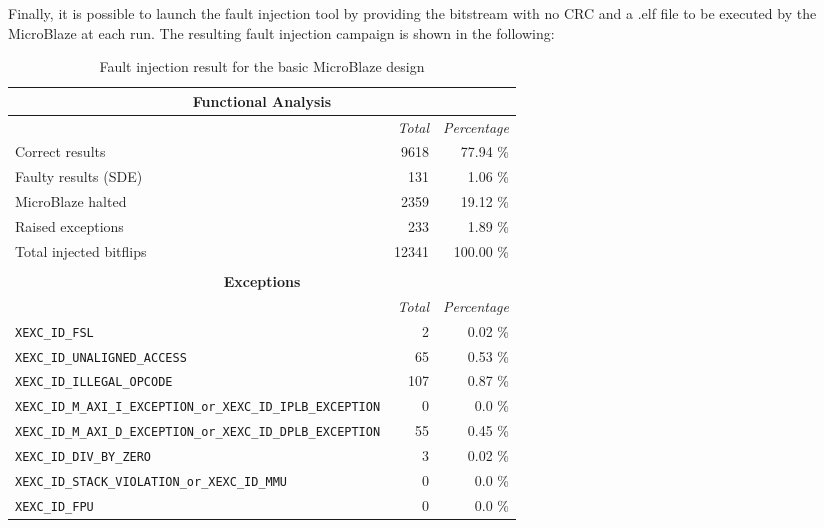 Finally, it is possible to launch the fault injection tool by providing the bitstream with no CRC and a .elf file to be executed by the MicroBlaze at each run. The resulting fault injection campaign is shown in the following:

\begin{table}[H]
\small
\centering
\begin{tabular}{ l|rr }
    \hline
    \multicolumn{3}{|c|}{\textbf{Functional Analysis}} \\
    \hline
    &\textit{Total}&\textit{Percentage} \\
    \cline{2-3}
    Correct results & 9618 & 77.94 \%\\
    Faulty results (SDE) & 131 & 1.06 \%\\
    MicroBlaze halted & 2359 & 19.12 \%\\
    Raised exceptions & 233 & 1.89 \%\\
    \hline
    Total injected bitflips & 12341 & 100.00 \%\\
    \\
    \hline
    \multicolumn{3}{|c|}{\textbf{Exceptions}}\\
    \hline
    &\textit{Total}&\textit{Percentage} \\
    \cline{2-3}
    \small
    \texttt{XEXC\_ID\_FSL} & 2 & 0.02 \%\\
    \texttt{XEXC\_ID\_UNALIGNED\_ACCESS} & 65 & 0.53 \%\\
    \texttt{XEXC\_ID\_ILLEGAL\_OPCODE}& 107 & 0.87 \%\\
    \texttt{XEXC\_ID\_M\_AXI\_I\_EXCEPTION\_or\_XEXC\_ID\_IPLB\_EXCEPTION} & 0 & 0.0 \%\\
    \texttt{XEXC\_ID\_M\_AXI\_D\_EXCEPTION\_or\_XEXC\_ID\_DPLB\_EXCEPTION} & 55 & 0.45 \%\\
    \texttt{XEXC\_ID\_DIV\_BY\_ZERO} & 3 & 0.02 \%\\
    \texttt{XEXC\_ID\_STACK\_VIOLATION\_or\_XEXC\_ID\_MMU} & 0 & 0.0 \%\\
    \texttt{XEXC\_ID\_FPU} & 0 & 0.0 \%\\
    \hline
\end{tabular}
\caption{Fault injection result for the basic MicroBlaze design}
\label{tab:fi_base}
\end{table}



